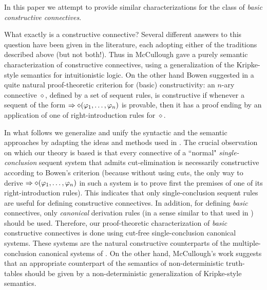 \documentclass{LMCS}
\theoremstyle{remark}
\newcommand{\Ra}{\Rightarrow}
\newcommand{\fe}{\varphi}
\begin{document}
In this paper we attempt to provide similar 
characterizations for the class of {\em basic constructive connectives}. 

What exactly is a constructive connective? Several different answers
to this question have been given in the literature,
each adopting either of the traditions described above
(but not both!). 
Thus in \cite{McCullough} McCullough
gave a purely semantic characterization of constructive connectives,
using a generalization of the Kripke-style semantics for intuitionistic logic.
On the other hand Bowen suggested in \cite{Bowen} 
a quite natural proof-theoretic criterion for (basic)
constructivity:  an $n$-ary connective $\diamond$, 
defined by a set of sequent rules, is constructive if
whenever a sequent of the form ${\Ra\diamond (\fe_1 \til \fe_n)}$ is provable, 
then it has a proof ending by an application of one 
of right-introduction rules for $\diamond$.





In what follows we generalize and unify the 
syntactic and the semantic approaches by adapting
the ideas and methods used in \cite{AL05}. 
The crucial observation on which our theory is based is that every
connective of a ``normal" {\em single-conclusion} sequent system
that admits cut-elimination is necessarily constructive 
according to Bowen's criterion (because without using
cuts, the only way to derive ${ \Rightarrow \diamond (\fe_1 \til \fe_n)}$
in such a system is to prove first the premises of one of 
its right-introduction rules). 
This indicates that only single-conclusion sequent rules are 
useful for defining constructive connectives.
In addition, for defining {\em basic} connectives, 
only {\em canonical} derivation rules (in a sense similar to that used 
in \cite{AL05}) 
should be used.
Therefore, our proof-theoretic characterization
of {\em basic} constructive connectives is done using 
cut-free single-conclusion canonical systems. 
These systems are the natural constructive counterparts of the 
multiple-conclusion canonical systems of \cite{AL05}.
On the other hand,
McCullough's work suggests that 
an appropriate counterpart of the semantics of non-deterministic truth-tables 
should be given by a non-deterministic generalization 
of Kripke-style semantics.
\end{document}
